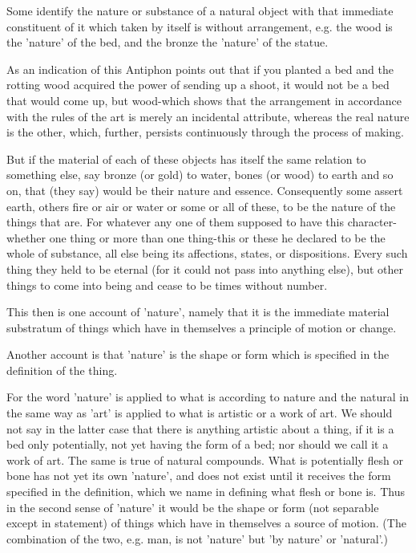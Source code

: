 Some identify the nature or substance of a natural object with that
immediate constituent of it which taken by itself is without arrangement,
e.g. the wood is the 'nature' of the bed, and the bronze the 'nature'
of the statue. 

As an indication of this Antiphon points out that if you planted a
bed and the rotting wood acquired the power of sending up a shoot,
it would not be a bed that would come up, but wood-which shows that
the arrangement in accordance with the rules of the art is merely
an incidental attribute, whereas the real nature is the other, which,
further, persists continuously through the process of making.

But if the material of each of these objects has itself the same relation
to something else, say bronze (or gold) to water, bones (or wood)
to earth and so on, that (they say) would be their nature and essence.
Consequently some assert earth, others fire or air or water or some
or all of these, to be the nature of the things that are. For whatever
any one of them supposed to have this character-whether one thing
or more than one thing-this or these he declared to be the whole of
substance, all else being its affections, states, or dispositions.
Every such thing they held to be eternal (for it could not pass into
anything else), but other things to come into being and cease to be
times without number. 

This then is one account of 'nature', namely that it is the immediate
material substratum of things which have in themselves a principle
of motion or change. 

Another account is that 'nature' is the shape or form which is specified
in the definition of the thing. 

For the word 'nature' is applied to what is according to nature and
the natural in the same way as 'art' is applied to what is artistic
or a work of art. We should not say in the latter case that there
is anything artistic about a thing, if it is a bed only potentially,
not yet having the form of a bed; nor should we call it a work of
art. The same is true of natural compounds. What is potentially flesh
or bone has not yet its own 'nature', and does not exist until it
receives the form specified in the definition, which we name in defining
what flesh or bone is. Thus in the second sense of 'nature' it would
be the shape or form (not separable except in statement) of things
which have in themselves a source of motion. (The combination of the
two, e.g. man, is not 'nature' but 'by nature' or 'natural'.)

